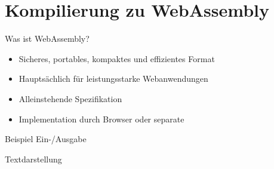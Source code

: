 \section{Kompilierung zu WebAssembly}
\begin{frame}{Was ist WebAssembly?}
	\begin{itemize}
		\item<1-> Sicheres, portables, kompaktes und effizientes Format
		\item<2-> Hauptsächlich für leistungsstarke Webanwendungen
		\item<3-> Alleinstehende Spezifikation
		\item<4-> Implementation durch Browser oder separate 
	\end{itemize}
\end{frame}

\begin{frame}{Beispiel Ein-/Ausgabe}

	\begin{minipage}{0.5\textwidth}
	\end{minipage}
	\hfill
	\begin{minipage}{0.45\textwidth}
	\end{minipage}

\end{frame}

\begin{frame}{Textdarstellung}

\end{frame}

\newcommand{\TableCell}[2]{\begin{minipage}{5cm}\Lirsting[float=H, fancyvrb={frame=none, numbers=none, fontsize=\footnotesize}, ranges={#2}]{listings/wasm_table.#1}\end{minipage}}


